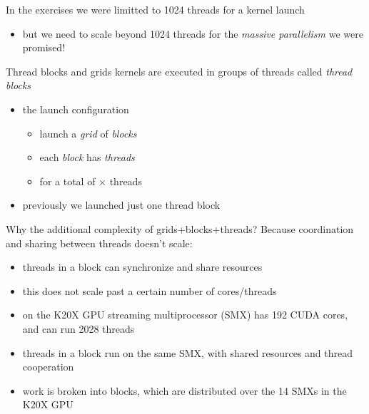 
\begin{frame}[fragile]{}
    \begin{info}{}
        In the \axpy exercises we were limitted to 1024 threads for a kernel launch
        \begin{itemize}
            \item but we need to scale beyond 1024 threads for the \emph{massive parallelism} we were promised!
        \end{itemize}
    \end{info}

    \begin{info}{Thread blocks and grids}
        kernels are executed in groups of threads called \emph{thread blocks}
        \vspace{-12pt}
        \begin{itemize}
            \item the launch configuration 
            \begin{itemize}
                \item launch a \emph{grid} of  \emph{blocks}
                \item each \emph{block} has  \emph{threads}
                \item for a total of $\times$ threads
            \end{itemize}
            \item previously we launched just one thread block 
        \end{itemize}
    \end{info}

\end{frame}

\begin{frame}[fragile]{}
    \begin{info}{Why the additional complexity of grids+blocks+threads?}
        \centering Because coordination and sharing between threads doesn't scale:
        \begin{itemize}
            \item threads in a block can synchronize and share resources
            \item this does not scale past a certain number of cores/threads
            \item on the K20X GPU streaming multiprocessor (SMX) has 192 CUDA cores, and can run 2028 threads
            \item threads in a block run on the same SMX, with shared resources and thread cooperation
            \item work is broken into blocks, which are distributed over the 14 SMXs in the K20X GPU
        \end{itemize}
    \end{info}
\end{frame}

